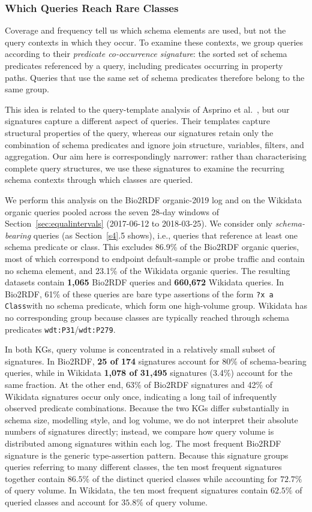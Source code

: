 \documentclass[sw]{iosart2x}
\begin{document}
\subsubsection{Which Queries Reach Rare Classes}\label{sec}
Coverage and frequency tell us which schema elements are used, but not the query contexts in which they occur. To examine these contexts, we group queries according to their \emph{predicate co-occurrence signature}: the sorted set of schema predicates referenced by a query, including predicates occurring in property paths. Queries that use the same set of schema predicates therefore belong to the same group.


This idea is related to the query-template analysis of Asprino et al.~\cite{asprino2023your}, but our signatures capture a different aspect of queries. Their templates capture structural properties of the query, whereas our signatures retain only the combination of schema predicates and ignore join structure, variables, filters, and aggregation. Our aim here is correspondingly narrower: rather than characterising complete query structures, we use these signatures to examine the recurring schema contexts through which classes are queried.


We perform this analysis on the Bio2RDF organic-2019 log and on the Wikidata organic queries pooled across the seven 28-day windows of Section~\ref{sec:equalintervals} (2017-06-12 to 2018-03-25). We consider only \emph{schema-bearing} queries (as Section~\ref{s4}.5 shows), i.e., queries that reference at least one schema predicate or class. This excludes 86.9\% of the Bio2RDF organic queries, most of which correspond to endpoint default-sample or probe traffic and contain no schema element, and 23.1\% of the Wikidata organic queries. The resulting datasets contain \textbf{1{,}065} Bio2RDF queries and \textbf{660{,}672} Wikidata queries. In Bio2RDF, 61\% of these queries are bare type assertions of the form \texttt{?x a Class}with no schema predicate, which form one high-volume group. Wikidata has no corresponding group because classes are typically reached through schema predicates \texttt{wdt:P31}/\texttt{wdt:P279}.


In both KGs, query volume is concentrated in a relatively small subset of signatures. In Bio2RDF, \textbf{25 of 174} signatures account for 80\% of schema-bearing queries, while in Wikidata \textbf{1{,}078 of 31{,}495} signatures (3.4\%) account for the same fraction. At the other end, 63\% of Bio2RDF signatures and 42\% of Wikidata signatures occur only once, indicating a long tail of infrequently observed predicate combinations. Because the two KGs differ substantially in schema size, modelling style, and log volume, we do not interpret their absolute numbers of signatures directly; instead, we compare how query volume is distributed among signatures within each log.
The most frequent Bio2RDF signature is the generic type-assertion pattern. Because this signature groups queries referring to many different classes, the ten most frequent signatures together contain $86.5\%$ of the distinct queried classes while accounting for $72.7\%$ of query volume. In Wikidata, the ten most frequent signatures contain $62.5\%$ of queried classes and account for $35.8\%$ of query volume.
\end{document}
